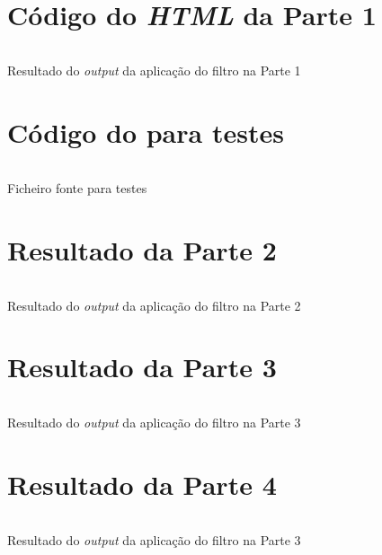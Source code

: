 \appendix

\chapter{Código do \emph{HTML} da Parte 1}
\label{appendix:a}

\begin{longlisting}
	\inputminted{html}{testes/res_html.html}
	\caption{Resultado do \emph{output} da aplicação do filtro na Parte 1}
	\label{listing:1}
\end{longlisting}


\chapter{Código do  para testes}
\label{appendix:a1}

\begin{longlisting}
	\inputminted{tex}{testes/ex3.bib}
	\caption{Ficheiro fonte  para testes}
	\label{listing:2}
\end{longlisting}


\chapter{Resultado da Parte 2}
\label{appendix:b}

\begin{longlisting}
	\inputminted{tex}{testes/resNorm.bib}
	\caption{Resultado do \emph{output} da aplicação do filtro na Parte 2}

	\label{listing:3}
\end{longlisting}

\chapter{Resultado da Parte 3}
\label{appendix:c}

\begin{longlisting}
	\inputminted{tex}{testes/res_pretty_printing.txt}
	\caption{Resultado do \emph{output} da aplicação do filtro na Parte 3}

	\label{listing:3}
\end{longlisting}

\chapter{Resultado da Parte 4}
\label{appendix:d1}
\begin{longlisting}
	\inputminted{tex}{testes/res_dot.dot}
	\caption{Resultado do \emph{output} da aplicação do filtro na Parte 3}

	\label{listing:3}
\end{longlisting}


